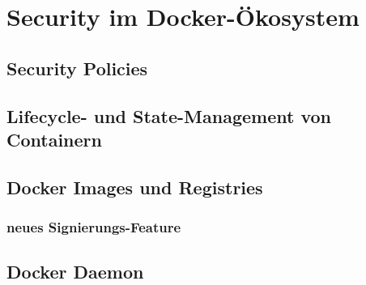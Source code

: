 \documentclass[../main.tex]{subfiles}
\begin{document}


\chapter{Security im Docker-Ökosystem}
\label{secEcosysstem}


  \section{Security Policies}


  \section{Lifecycle- und State-Management von Containern}

  \section{Docker Images und Registries}

		\subsection{neues Signierungs-Feature}
	\section{Docker Daemon}
\end{document}
